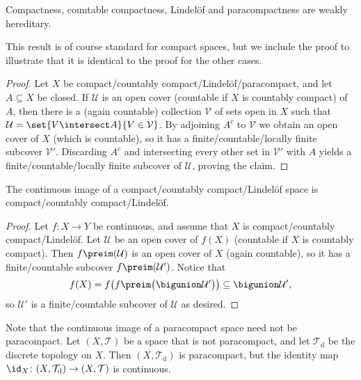 \documentclass[article, a4paper, 11pt, oneside]{memoir}
\numberwithin{equation}{chapter}
\newcommand{\calU}{\mathcal{U}}
\newcommand{\calV}{\mathcal{V}}
\newcommand{\calT}{\mathcal{T}}
\begin{document}
\begin{proposition}
    \label{thm:compact-Lindelof-closed-subset}
    Compactness, countable compactness, Lindelöf and paracompactness are weakly hereditary.
\end{proposition}
%
This result is of course standard for compact spaces, but we include the proof to illustrate that it is identical to the proof for the other cases.

\begin{proof}
    Let $X$ be compact/countably compact/Lindelöf/paracompact, and let $A \subseteq X$ be closed. If $\calU$ is an open cover (countable if $X$ is countably compact) of $A$, then there is a (again countable) collection $\calV$ of sets open in $X$ such that $\calU = \set{V \intersect A}{V \in \calV}$. By adjoining $A^c$ to $\calV$ we obtain an open cover of $X$ (which is countable), so it has a finite/countable/locally finite subcover $\calV'$. Discarding $A^c$ and intersecting every other set in $\calV'$ with $A$ yields a finite/countable/locally finite subcover of $\calU$, proving the claim.
\end{proof}


\begin{proposition}
    The continuous image of a compact/countably compact/Lindelöf space is compact/countably compact/Lindelöf.
\end{proposition}

\begin{proof}
    Let $f \colon X \to Y$ be continuous, and assume that $X$ is compact/countably compact/Lindelöf. Let $\calU$ be an open cover of $f(X)$ (countable if $X$ is countably compact). Then $f\preim(\calU)$ is an open cover of $X$ (again countable), so it has a finite/countable subcover $f\preim(\calU')$. Notice that
    \begin{equation*}
        f(X)
            = f \bigl( f\preim \bigl( \bigunion \calU' \bigr) \bigr)
            \subseteq \bigunion \calU',
    \end{equation*}
    so $\calU'$ is a finite/countable subcover of $\calU$ as desired.
\end{proof}


\begin{remark}
    Note that the continuous image of a paracompact space need not be paracompact. Let $(X,\calT)$ be a space that is not paracompact, and let $\calT_{\mathrm{d}}$ be the discrete topology on $X$. Then $(X,\calT_{\mathrm{d}})$ is paracompact, but the identity map $\id_X \colon (X,\calT_{\mathrm{d}}) \to (X,\calT)$ is continuous.
\end{remark}
\end{document}
